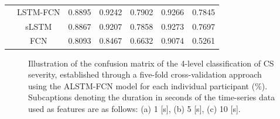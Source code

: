 \documentclass{ieeeaccess}
\begin{document}
\begin{table}[htbp!]
\begin{tabular*}{0.68\textwidth}{c|c|c|cc|cc}
                            & LSTM-FCN  & 0.8895 & \multicolumn{1}{c|}{0.9242}       & 0.7902   & \multicolumn{1}{c|}{0.9266}       & 0.7845   \\ \cline{2-7} 
                            & sLSTM      & 0.8867 & \multicolumn{1}{c|}{0.9207}       & 0.7858   & \multicolumn{1}{c|}{0.9273}       & 0.7697   \\ \cline{2-7} 
                            & FCN       & 0.8093 & \multicolumn{1}{c|}{0.8467}       & 0.6632   & \multicolumn{1}{c|}{0.9074}       & 0.5261   \\ \hline
\end{tabular*}
\end{table}


\begin{figure}[htbp!]
    \centering
    \hfill
    \hfill
    \caption{Illustration of the confusion matrix of the 4-level classification of CS severity, established through a five-fold cross-validation approach using the ALSTM-FCN model for each individual participant (\%). Subcaptions denoting the duration in seconds of the time-series data used as features are as follows: (a) 1 [s], (b) 5 [s], (c) 10 [s].}
    \label{fig:ALSTM-FCN}
\end{figure}
\end{document}
